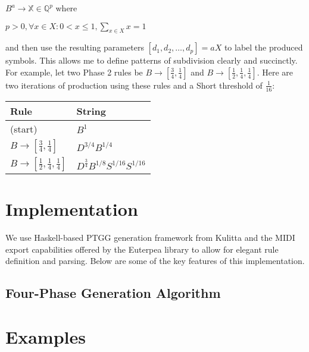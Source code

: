 \documentclass{article}
\begin{document}
$B^a \rightarrow \mathbb{X} \in \mathbb{Q}^{p}$ where 

$p > 0 , \forall x \in X: 0 < x \leq 1, \sum_{x \in X} x = 1$

and then use the resulting parameters $[d_1,d_2,…,d_p]=aX$ to label the produced symbols. This allows me to define patterns of subdivision clearly and succinctly. For example, let two Phase 2 rules be $B \rightarrow [\frac{3}{4}, \frac{1}{4}]$ and $B \rightarrow [\frac{1}{2}, \frac{1}{4}, \frac{1}{4}]$. Here are two iterations of production using these rules and a Short threshold of $\frac{1}{16}$:

\bgroup
\def\arraystretch{1.5}
\begin{center}
\begin{tabular}{ l l }
 Rule & String \\
 \hline
 (start)                                                  & $B^{1}$ \\
 $B \rightarrow [\frac{3}{4}, \frac{1}{4}]$               & $D^{3/4} B^{1/4}$ \\
 $B \rightarrow [\frac{1}{2}, \frac{1}{4}, \frac{1}{4}]$  & $D^{\frac{3}{4}} B^{1/8} S^{1/16} S^{1/16}$ \\
\end{tabular}
\end{center}
\egroup


\section{Implementation}

We use Haskell-based PTGG generation framework from Kulitta and the MIDI export capabilities offered by the Euterpea library \cite{euterpea} to allow for elegant rule definition and parsing. Below are some of the key features of this implementation.

\subsection{Four-Phase Generation Algorithm} 


\section{Examples}

\end{document}
